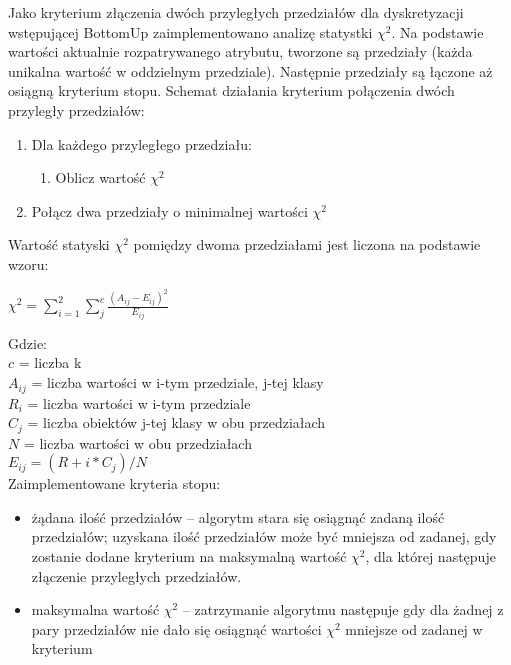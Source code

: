 Jako kryterium złączenia dwóch przyległych przedziałów dla dyskretyzacji wstępującej BottomUp zaimplementowano analizę statystki $\chi^2$. Na podstawie wartości aktualnie rozpatrywanego atrybutu, tworzone są przedziały (każda unikalna wartość w oddzielnym przedziale). Następnie przedziały są łączone aż osiągną kryterium stopu. Schemat działania kryterium połączenia dwóch przyległy przedziałów:
\begin{enumerate}
	\item{Dla każdego przyległego przedziału:}
	\begin{enumerate}
		\item{Oblicz wartość $\chi^2$}
	\end{enumerate}
	\item{Połącz dwa przedziały o minimalnej wartości $\chi^2$}
\end{enumerate}
Wartość statyski $\chi^2$ pomiędzy dwoma przedziałami jest liczona na podstawie wzoru: \\

\begin{center}
$\chi^2 = \sum_{i=1}^{2}\sum_{j}^{c}\frac{(A_{ij}-E_{ij})^2}{E_{ij}}$
\end{center}
Gdzie:
\\$c$ = liczba k
\\$A_{ij}$ = liczba wartości w i-tym przedziale, j-tej klasy
\\$R_{i}$ = liczba wartości w i-tym przedziale
\\$C_{j}$ = liczba obiektów j-tej klasy w obu przedziałach
\\$N$ = liczba wartości w obu przedziałach
\\$E_{ij} = (R+{i}*C_{j})/N$
\\Zaimplementowane kryteria stopu:
\begin{itemize}
	\item{żądana ilość przedziałów -- algorytm stara się osiągnąć zadaną ilość przedziałów; uzyskana ilość przedziałów może być mniejsza od zadanej, gdy zostanie dodane kryterium  na maksymalną wartość $\chi^2$, dla której następuje złączenie przyległych przedziałów. }
	\item{maksymalna wartość $\chi^2$ -- zatrzymanie algorytmu następuje gdy dla żadnej z pary przedziałów nie dało się osiągnąć wartości $\chi^2$ mniejsze od zadanej w kryterium}
\end{itemize}
